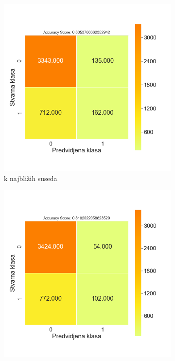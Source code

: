 \documentclass[12pt,oneside]{memoir}
\begin{document}
\begin{figure}[!ht]
    \centering
    \begin{subfigure}[b]{0.45\textwidth}
        \centering
        \includegraphics[width=\textwidth]{KNN_basic_data_confussion_matrix}
        \caption{k najbližih suseda}
        \label{fig:knear}
    \end{subfigure}
    \begin{subfigure}[b]{0.45\textwidth}
        \centering
        \includegraphics[width=\textwidth]{LR_basic_data_confussion_matrix}

\end{subfigure}
\end{figure}
\end{document}
